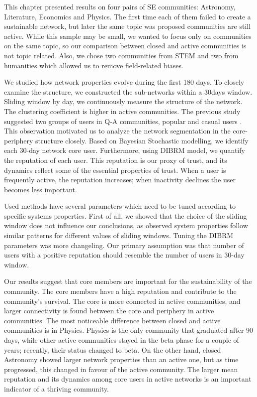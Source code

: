 This chapter presented results on four pairs of SE communities: Astronomy, Literature, Economics and Physics. The first time each of them failed to create a sustainable network, but later the same topic was proposed communities are still active. While this sample may be small, we wanted to focus only on communities on the same topic, so our comparison between closed and active communities is not topic related. Also, we chose two communities from STEM and two from humanities which allowed us to remove field-related biases. 

We studied how network properties evolve during the first 180 days. To closely examine the structure, we constructed the sub-networks within a 30days window. Sliding window by day, we continuously measure the structure of the network. The clustering coefficient is higher in active communities. The previous study suggested two groups of users in Q-A communities, popular and casual users \cite{santos2019self}. This observation motivated us to analyze the network segmentation in the core-periphery structure closely. Based on Bayesian Stochastic modelling, we identify each 30-day network core user.
Furthermore, using DIBRM model\cite{melnikovDynamicInteractionBasedReputation2018}, we quantify the reputation of each user. This reputation is our proxy of trust, and its dynamics reflect some of the essential properties of trust. When a user is frequently active, the reputation increases; when inactivity declines the user becomes less important.   

Used methods have several parameters which need to be tuned according to specific systems properties. First of all, we showed that the choice of the sliding window does not influence our conclusions, as observed system properties follow similar patterns for different values of sliding windows. Tuning the DIBRM parameters was more changeling. Our primary assumption was that number of users with a positive reputation should resemble the number of users in 30-day window.

Our results suggest that core members are important for the sustainability of the community. The core members have a high reputation and contribute to the community's survival. The core is more connected in active communities, and larger connectivity is found between the core and periphery in active communities. The most noticeable difference between closed and active communities is in Physics. Physics is the only community that graduated after 90 days, while other active communities stayed in the beta phase for a couple of years; recently, their status changed to beta. On the other hand, closed Astronomy showed larger network properties than an active one, but as time progressed, this changed in favour of the active community. The larger mean reputation and its dynamics among core users in active networks is an important indicator of a thriving community.

